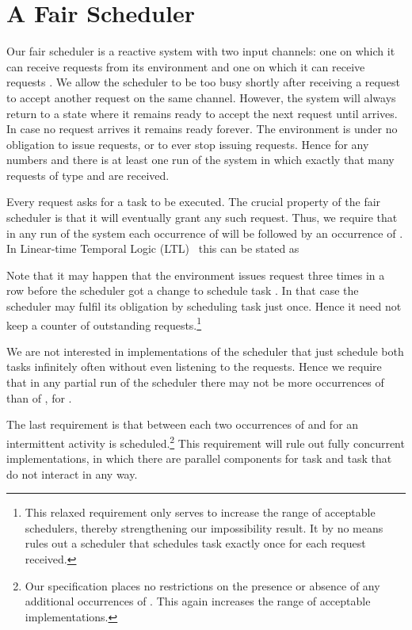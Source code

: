 \documentclass[smallcondensed]{svjour3}
\newcounter {part}
\begin{document}
\section{A Fair Scheduler}\label{sec:fair scheduler}


Our fair scheduler is a reactive system with two input channels: one
on which it can receive requests  from its environment and
one on which it can receive requests . We allow the scheduler to
be too busy shortly after receiving a request  to accept another
request  on the same channel. However, the system will always
return to a state where it remains ready to accept the next request 
until  arrives. In case no request arrives it 
remains ready forever. The environment is under no
obligation to issue requests, or to ever stop issuing requests.
Hence for any numbers  and  there is at least one run of the system in
which exactly that many requests of type  and  are received.

Every request  asks for a task  to be executed.
The crucial property of the fair scheduler is that it will eventually
grant any such request. Thus, we require that in any run of the system
each occurrence of  will be followed by an occurrence of .
In Linear-time Temporal Logic (LTL)~\cite{Pnueli77} this can be stated as

\noindent
Note that it may happen that the environment issues request 
three times in a row before the scheduler got a change to schedule
task . In that case the scheduler may fulfil its obligation by
scheduling task  just once. Hence it need not keep a counter of
outstanding requests.\footnote{This relaxed requirement only
  serves to increase the range of acceptable schedulers, thereby
  strengthening our impossibility result. It by no means rules out a
  scheduler that schedules task  exactly once for each request
   received.}

We are not interested in implementations of the scheduler that just
schedule both tasks infinitely often without even listening to the
requests. Hence we require that in any partial run of the scheduler
there may not be more occurrences of  than of , for .

The last requirement is that between each two occurrences of  and
 for  an intermittent activity  is
scheduled.\footnote{Our specification places no restrictions on the
  presence or absence of any additional occurrences of . This again
  increases the range of acceptable implementations.}
This requirement will rule out fully concurrent implementations, in
which there are parallel components for task  and task  that do not
interact in any way.
\end{document}

